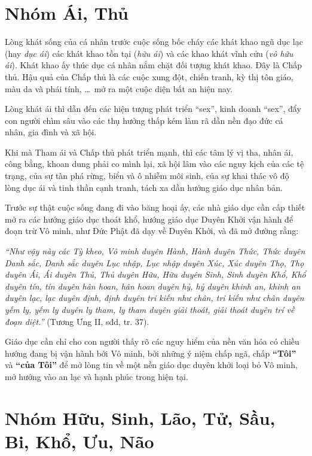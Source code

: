 
\section{Nhóm Ái, Thủ} %
\label{sec:ai_thu}

Lòng khát sống của cá nhân trước cuộc sống bốc cháy các khát khao ngũ dục lạc (hay \emph{dục ái}) các khát khao tồn tại (\emph{hữu ái}) và các khao khát vĩnh cửu (\emph{vô hữu ái}). Khát khao ấy thúc dục cá nhân nắm chặt đối tượng khát khao. Đây là Chấp thủ. Hậu quả của Chấp thủ là các cuộc xung đột, chiến tranh, kỳ thị tôn giáo, màu da và phái tính, \ldots ~mở ra một cuộc diện bất an hiện nay.

Lòng khát ái thì dẫn đến các hiện tượng phát triển ``sex'', kinh doanh ``sex'', đẩy con người chìm sâu vào các thụ hưởng thấp kém làm rã dần nền đạo đức cá nhân, gia đình và xã hội.

Khi mà Tham ái và Chấp thủ phát triển mạnh, thì các tâm lý vị tha, nhân ái, công bằng, khoan dung phải co mình lại, xã hội lâm vào các nguy kịch của các tệ trạng, của sự tàn phá rừng, biển và ô nhiễm môi sinh, của sự khai thác vô độ lòng dục ái và tinh thần cạnh tranh, tách xa dần hướng giáo dục nhân bản.

Trước sự thật cuộc sống đang đi vào băng hoại ấy, các nhà giáo dục cần cấp thiết mở ra các hướng giáo dục thoát khổ, hướng giáo dục Duyên Khởi vận hành để đoạn trừ Vô minh, như Đức Phật đã dạy về Duyên Khởi, và đã mở đường rằng:

\emph{``Như vậy này các Tỳ kheo, Vô minh duyên Hành, Hành duyên Thức, Thức duyên Danh sắc, Danh sắc duyên Lục nhập, Lục nhập duyên Xúc, Xúc duyên Thọ, Thọ duyên Ái, Ái duyên Thủ, Thủ duyên Hữu, Hữu duyên Sinh, Sinh duyên Khổ, Khổ duyên tín, tín duyên hân hoan, hân hoan duyên hỷ, hỷ duyên khinh an, khinh an duyên lạc, lạc duyên định, định duyên tri kiến như chân, tri kiến như chân duyên yếm ly, yếm ly duyên ly tham, ly tham duyên giải thoát, giải thoát duyên trí về đoạn diệt.''} (Tương Ưng II, sđd, tr. 37).

Giáo dục cần chỉ cho con người thấy rõ các nguy hiểm của nền văn hóa có chiều hướng đang bị vận hành bởi Vô minh, bởi những ý niệm chấp ngã, chấp \textbf{``Tôi''} và \textbf{``của Tôi''} để mở lòng tin về một nền giáo dục duyên khởi loại bỏ Vô minh, mở hướng vào an lạc và hạnh phúc trong hiện tại.


\section{Nhóm Hữu, Sinh, Lão, Tử, Sầu, Bi, Khổ, Ưu, Não} %
\label{sec:huu_sinh_lao_tu_sau_bi}

